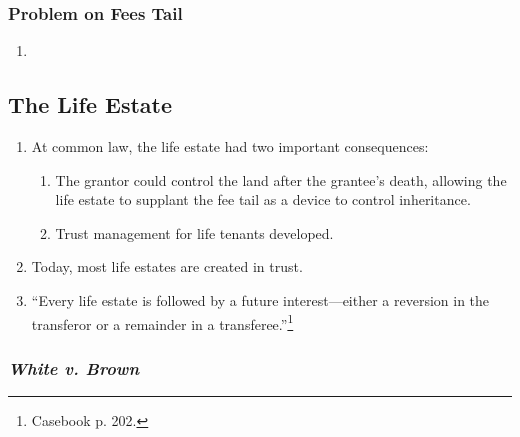 \subsubsection{Problem on Fees Tail}

\begin{enumerate}
    \item %
\end{enumerate}

\subsection{The Life Estate}

\begin{enumerate}
    \item At common law, the life estate had two important consequences:
    \begin{enumerate}
        \item The grantor could control the land after the grantee's death, 
        allowing the life estate to supplant the fee tail as a device to 
        control inheritance.
        \item Trust management for life tenants developed.
    \end{enumerate}
    \item Today, most life estates are created in trust.
    \item ``Every life estate is followed by a future interest---either a 
    reversion in the transferor or a remainder in a 
    transferee.''\footnote{Casebook p. 202.}
\end{enumerate}

\subsubsection{\emph{White v. Brown}}

